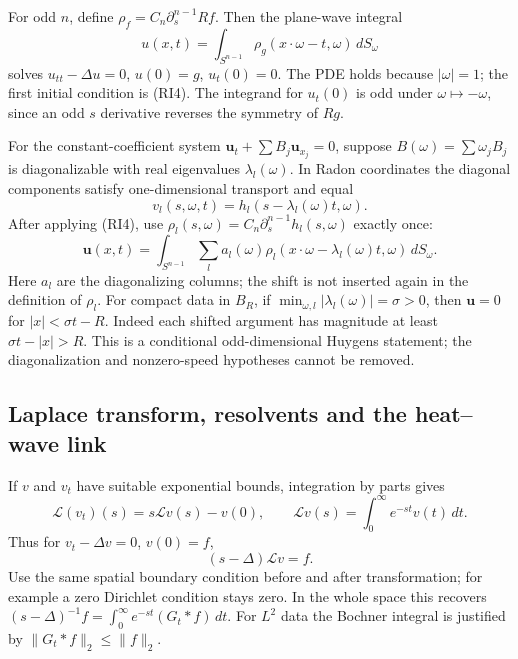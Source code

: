 For odd $n$, define $\rho_f=C_n\partial_s^{n-1}Rf$.
Then the plane-wave integral
\[
 u(x,t)=\int_{S^{n-1}}\rho_g(x\cdot\omega-t,\omega)\,dS_\omega
\]
solves $u_{tt}-\Delta u=0$, $u(0)=g$, $u_t(0)=0$.
The PDE holds because $|\omega|=1$; the first initial condition is
(RI4). The integrand for $u_t(0)$ is odd under $\omega\mapsto-\omega$,
since an odd $s$ derivative reverses the symmetry of $Rg$.

For the constant-coefficient system
$\mathbf u_t+\sum B_j\mathbf u_{x_j}=0$,
suppose $B(\omega)=\sum\omega_jB_j$ is diagonalizable with real
eigenvalues $\lambda_l(\omega)$.
In Radon coordinates the diagonal components satisfy one-dimensional
transport and equal
\[
 v_l(s,\omega,t)=h_l(s-\lambda_l(\omega)t,\omega).
\]
After applying (RI4), use
$\rho_l(s,\omega)=C_n\partial_s^{n-1}h_l(s,\omega)$ exactly once:
\[
 \mathbf u(x,t)=\int_{S^{n-1}}\sum_l
 a_l(\omega)\rho_l(x\cdot\omega-\lambda_l(\omega)t,\omega)\,dS_\omega .
\]
Here $a_l$ are the diagonalizing columns; the shift is not inserted
again in the definition of $\rho_l$.
For compact data in $B_R$, if
$\min_{\omega,l}|\lambda_l(\omega)|=\sigma>0$,
then $\mathbf u=0$ for $|x|<\sigma t-R$.
Indeed each shifted argument has magnitude at least $\sigma t-|x|>R$.
This is a conditional odd-dimensional Huygens statement; the
diagonalization and nonzero-speed hypotheses cannot be removed.
\Needspace{45mm}

\Needspace{35mm}
\subsection{Laplace transform, resolvents and the heat--wave link}
If $v$ and $v_t$ have suitable exponential bounds, integration by parts gives
\[
 \mathcal L(v_t)(s)=s\mathcal Lv(s)-v(0),\qquad
 \mathcal Lv(s)=\int_0^\infty e^{-st}v(t)\,dt .
\]
Thus for $v_t-\Delta v=0$, $v(0)=f$,
\[
 (s-\Delta)\mathcal Lv=f .
\]
Use the same spatial boundary condition before and after transformation;
for example a zero Dirichlet condition stays zero.
In the whole space this recovers
$(s-\Delta)^{-1}f=\int_0^\infty e^{-st}(G_t*f)\,dt$.
For $L^2$ data the Bochner integral is justified by
$\|G_t*f\|_2\leq\|f\|_2$.
\Needspace{45mm}

